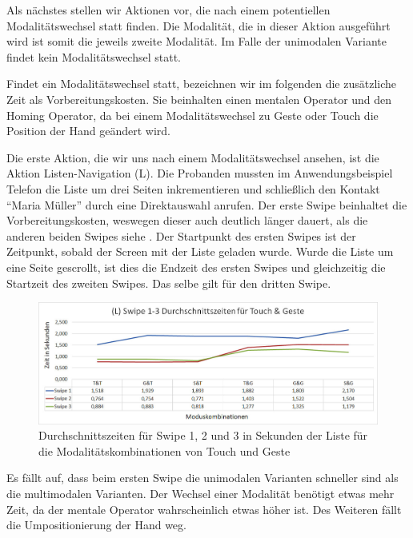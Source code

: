 Als nächstes stellen wir Aktionen vor, die nach einem potentiellen Modalitätswechsel statt finden. 
Die Modalität, die in dieser Aktion ausgeführt wird ist somit die jeweils zweite Modalität. 
Im Falle der unimodalen Variante findet kein Modalitätswechsel statt. 

Findet ein Modalitätswechsel statt, bezeichnen wir im folgenden die zusätzliche Zeit als Vorbereitungskosten. 
Sie beinhalten einen mentalen Operator und den Homing Operator, da bei einem Modalitätswechsel zu Geste oder Touch die Position der Hand geändert wird.

Die erste Aktion, die wir uns nach einem Modalitätswechsel ansehen, ist die Aktion Listen-Navigation (L). 
Die Probanden mussten im Anwendungsbeispiel Telefon die Liste um drei Seiten inkrementieren und schließlich den Kontakt "`Maria Müller"' durch eine Direktauswahl anrufen. 
Der erste Swipe beinhaltet die Vorbereitungskosten, weswegen dieser auch deutlich länger dauert, als die anderen beiden Swipes siehe . 
Der Startpunkt des ersten Swipes ist der Zeitpunkt, sobald der Screen mit der Liste geladen wurde. 
Wurde die Liste um eine Seite gescrollt, ist dies die Endzeit des ersten Swipes und gleichzeitig die Startzeit des zweiten Swipes.
Das selbe gilt für den dritten Swipe.

\begin{figure}[ht]
  \centering
  \includegraphics[width=1\textwidth]{img/Swipe1-3_Phone.JPG}
  \caption{Durchschnittszeiten für Swipe 1, 2 und 3 in Sekunden der Liste für die Modalitätskombinationen von Touch und Geste}
  \label{fig:Swipe13Phone}
\end{figure}

Es fällt auf, dass beim ersten Swipe die unimodalen Varianten schneller sind als die multimodalen Varianten. 
Der Wechsel einer Modalität benötigt etwas mehr Zeit, da der mentale Operator wahrscheinlich etwas höher ist.
Des Weiteren fällt die Umpositionierung der Hand weg. 

